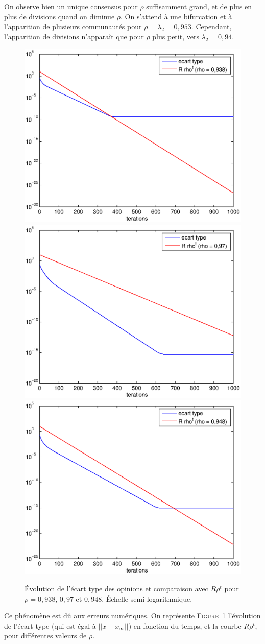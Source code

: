 \documentclass[12pt]{article}
\newcommand{\fig}[1]{\textsc{Figure}~\ref{#1}}
\begin{document}
On observe bien un unique consensus pour $\rho$ suffisamment grand, et
de plus en plus de divisions quand on diminue $\rho$. On s'attend
à une bifurcation et à l'apparition de plusieurs communautés pour
$\rho = \lambda_2 = 0,953$. Cependant, l'apparition de divisions
n'apparaît que pour $\rho$ plus petit, vers $\lambda_2 = 0,94$.
\begin{figure}[h!]
	\begin{center}
		\includegraphics[width=.4\textwidth]{var_rho_0938}
		\includegraphics[width=.4\textwidth]{var_rho_097}
		\includegraphics[width=.5\textwidth]{var_rho_0948}
		\caption{Évolution de l'écart type des opinions et
                  comparaison avec $R \rho^t$ pour $\rho = 0,938$,
                  $0,97$ et $0,948$. Échelle semi-logarithmique.}
		\label{num_coupure}
	\end{center}
\end{figure}
Ce phénomène est dû aux erreurs numériques. On représente
\fig{num_coupure} l'évolution de l'écart type (qui est égal à $||x -
x_\infty||$) en fonction du temps, et la courbe $R \rho^t$, pour
différentes valeurs de $\rho$.
\end{document}
